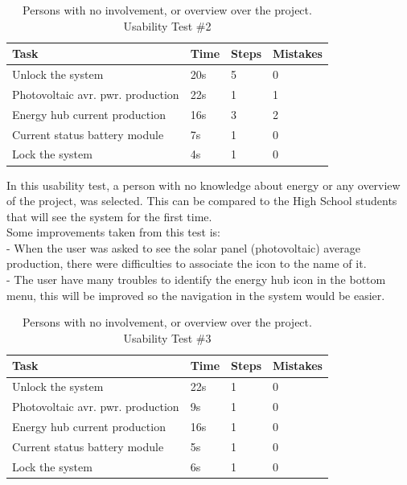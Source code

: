 \begin{table}[H]
	\begin{tabular}{ | l | l | l | l |}
		\hline
		Task 					     & 		Time 	& 	Steps 	&	 Mistakes \\ \hline
		Unlock the system 			     & 		20s 		&	 5 		& 		0 	\\ \hline
		Photovoltaic avr. pwr. production  & 		22s 		& 	 1 		& 		1 	\\ \hline
		Energy hub current production 	     & 		16s 		& 	 3 		& 		2 	\\ \hline
		Current status battery module 	     & 		7s 		& 	 1 		& 		0 	\\ \hline
		Lock the system 			     & 		4s 		& 	 1 		& 		0 	\\ \hline
	\end{tabular}
     \caption{Persons with no involvement, or overview over the project. Usability Test \#2}
\end{table}

In this usability test, a person with no knowledge about energy or any overview of the project, was selected. This can be compared to the High School students that will see the system for the first time.\\
Some improvements taken from this test is:\\
- When the user was asked to see the solar panel (photovoltaic) average production, there were difficulties to associate the icon to the name of it.\\
- The user have many troubles to identify the energy hub icon in the bottom menu, this will be improved so the navigation in the system would be easier.\\

\begin{table}[H]
	\begin{tabular}{ | l | l | l | l |}
		\hline
		Task 					      & 	Time 	& 	Steps 	& 	Mistakes  \\ \hline
		Unlock the system 			      & 	22s 		& 	1 		& 	0 		\\ \hline
		Photovoltaic avr. pwr. production   & 	9s 		& 	1 		& 	0 		\\ \hline
		Energy hub current production 	      & 	16s 		& 	1 		& 	0 		\\ \hline
		Current status battery module 	      & 	5s 		& 	1 		& 	0 		\\ \hline
		Lock the system 			      & 	6s 		& 	1 		& 	0		\\ \hline
	\end{tabular}
    \caption{Persons with no involvement, or overview over the project. Usability Test \#3}
\end{table}

